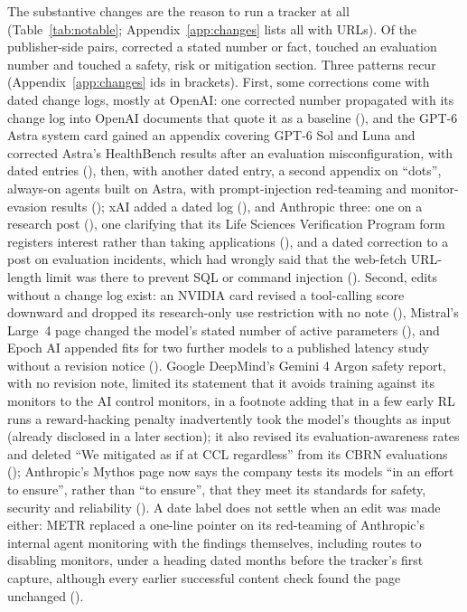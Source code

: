 \documentclass[10pt,a4paper]{article}
\begin{document}
The substantive changes are the reason to run a tracker at all (Table~\ref{tab:notable};
Appendix~\ref{app:changes} lists all \nAppendixRows{} with URLs). Of the publisher-side pairs,
\nFlagCorrection{} corrected a stated number or fact, \nFlagScore{} touched an evaluation number and \nFlagSafety{}
touched a safety, risk or mitigation section. Three patterns recur (Appendix~\ref{app:changes} ids in
brackets). First, some corrections come with dated change logs, mostly at OpenAI: one corrected number
propagated with its change log into \notablePropagatedMax{} OpenAI documents that quote it as a baseline
(\exPropagated), and the GPT-6 Astra system card gained an appendix covering GPT-6 Sol and Luna
and corrected Astra's HealthBench results after an evaluation misconfiguration, with dated entries
(\exAstraAppendix), then, with another dated entry, a second appendix on ``dots'', always-on agents built on
Astra, with prompt-injection red-teaming and monitor-evasion results (\exAstraDots); xAI added a dated log (\exGrokLog), and Anthropic three: one on a research post (\exAnthropicLog), one
clarifying that its Life Sciences Verification Program form registers interest rather than taking applications (\exLifeSciLog),
and a dated correction to a post on evaluation incidents, which had wrongly said that the web-fetch URL-length limit
was there to prevent SQL or command injection (\exFetchCorrection). Second, edits
without a change log exist: an NVIDIA card revised a tool-calling score downward and dropped its research-only
use restriction with no note (\exVoiceChat), Mistral's Large~4 page changed the model's stated number of active
parameters (\exMistralParams), and Epoch AI appended fits for two further models to a published
latency study without a revision notice (\exEpochAppendix). Google DeepMind's Gemini 4 Argon safety report, with no
revision note, limited its statement that it avoids training against its monitors to the AI control monitors, in a
footnote adding that in a few early RL runs a reward-hacking penalty inadvertently took the model's thoughts as input
(already disclosed in a later section); it also revised its evaluation-awareness rates and deleted ``We mitigated as
if at CCL regardless'' from its CBRN evaluations (\exArgonRevision); Anthropic's Mythos page now says the company tests its models ``in an effort to ensure'', rather than ``to
ensure'', that they meet its standards for safety, security and reliability (\exMythosHedge).
A date label does not settle when an edit was made either: METR replaced a one-line pointer on its red-teaming of Anthropic's internal agent monitoring with the findings
themselves, including routes to disabling monitors, under a heading dated months before the tracker's first
capture, although every earlier successful content check found the page unchanged (\exMetrMonitoring).
\end{document}
